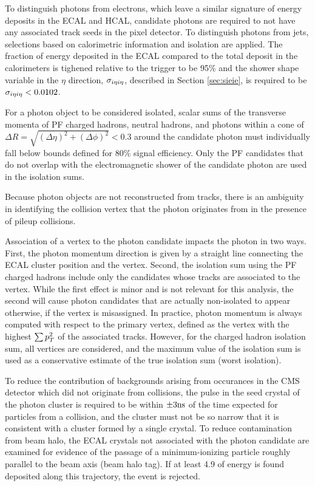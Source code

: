 To distinguish photons from electrons, which leave a similar
 signature of energy deposits in the ECAL and HCAL,
 candidate photons are required
 to not have any associated track seeds in the pixel detector. 
To distinguish photons from jets, selections based on calorimetric
 information and isolation are applied. 
The fraction of energy deposited in the ECAL compared 
 to the total deposit in the calorimeters
 is tighened relative to the trigger to be 95\%
 and the shower shape variable in the $\eta$ direction,
  $\sigma_{i\eta i\eta}$, described in Section \ref{sec:sieie},
 is required to be $\sigma_{i\eta i\eta} < 0.0102$. 


For a photon object to be considered isolated,
 scalar sums of the transverse momenta of PF charged hadrons, neutral
 hadrons, and photons within a cone of $\Delta R = \sqrt{(\Delta
  \eta)^2 + (\Delta \phi)^2} < 0.3$ around the candidate photon must
 individually fall below bounds defined for 80\% signal
 efficiency. 
Only the PF candidates that do not overlap with the 
 electromagnetic shower of the candidate photon are used in the 
 isolation sums.

Because photon objects are not reconstructed from tracks,
 there is an ambiguity in identifying the collision
 vertex that the photon originates from in the presence 
 of pileup collisions.

Association of a vertex to the photon candidate impacts the photon in two ways. 
First, the photon momentum direction is given by a straight line connecting
the ECAL cluster position and the vertex. Second, the isolation sum 
using the PF charged hadrons include only the candidates whose tracks
are associated to the vertex. While the first effect is minor and is
not relevant for this analysis, the second will cause photon
candidates that are actually non-isolated to appear otherwise, if the 
vertex is misassigned.  In practice, photon momentum is always
computed with respect to the primary vertex, defined as the vertex
with the highest $\sum p_T^2$ of the associated tracks.  However, for 
the charged hadron isolation sum, all vertices are considered, and the 
maximum value of the isolation sum is used as a conservative estimate
of the true isolation sum (worst isolation).

To reduce the contribution of backgrounds arising from 
 occurances in the CMS detector which did not originate from
 collisions, the pulse in the seed crystal of the photon cluster
 is required to be within $\pm 3\mathrm{ns}$ of the time expected
 for particles from a collision, and the cluster must not
 be so narrow that it is consistent with a cluster formed by a single crystal.  
To reduce contamination from beam halo, the ECAL
 crystals not  associated with the photon candidate are 
 examined for evidence of the passage of a minimum-ionizing
 particle roughly parallel to the beam axis (beam halo tag).
If at least  4.9 \GeV of energy is found deposited along
 this trajectory, the event is rejected.

